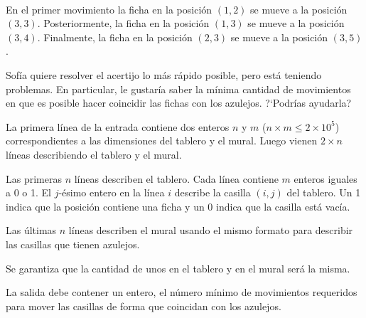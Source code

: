 \documentclass{oci}
\def\nrows{3}
\def\ncols{5}
\newcommand{\drawnumbers}{
  \foreach \col in {1, ..., \ncols} {
    \node at (\col - 0.5, 3.35) {\col};
  }
  \foreach \row in {1, ..., \nrows} {
    \node at (-0.35, \nrows - \row + 0.5) {\row};
  }
}
\begin{document}
\begin{problemDescription}
\begin{center}
  ~
\end{center}
En el primer movimiento la ficha en la posición $(1, 2)$ se mueve a la
posición $(3, 3)$.
%
Posteriormente, la ficha en la posición $(1, 3)$ se mueve a la posición
$(3, 4)$.
%
Finalmente, la ficha en la posición $(2, 3)$ se mueve a la posición  $(3, 5)$.

Sofía quiere resolver el acertijo lo más rápido posible, pero está
teniendo problemas.
En particular, le gustaría saber la mínima cantidad de movimientos
en que es posible hacer coincidir las fichas con los azulejos.
?`Podrías ayudarla?

\end{problemDescription}

\begin{inputDescription}
  La primera línea de la entrada contiene dos enteros $n$ y $m$ ($n \times m \leq 2 \times 10^5$)
  correspondientes a las dimensiones del tablero y el mural.
  Luego vienen $2 \times n$ líneas describiendo el tablero y el mural.

  Las primeras $n$ líneas describen el tablero.
  Cada línea contiene $m$ enteros iguales a 0 o 1.
  El $j$-ésimo entero en la línea $i$ describe la casilla $(i, j)$ del tablero.
  Un 1 indica que la posición contiene una ficha y un 0 indica que la casilla
  está vacía.

  Las últimas $n$ líneas describen el mural usando el mismo formato para describir
  las casillas que tienen azulejos.

  Se garantiza que la cantidad de unos en el tablero y en el mural será la misma.
\end{inputDescription}

\begin{outputDescription}
La salida debe contener un entero, el número mínimo de movimientos
requeridos para mover las casillas de forma que coincidan con
los azulejos.
\end{outputDescription}
\end{document}
